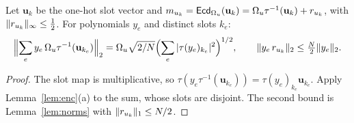 \begin{lemma}[Masking]\label{lem:mask}
Let $\mathbf u_k$ be the one-hot slot vector and $m_{u_k}=\mathsf{Ecd}_{\Omega_u}(\mathbf u_k)=\Omega_u\tau^{-1}(\mathbf u_k)+r_{u_k}$, with $\lVert r_{u_k}\rVert_\infty\le\frac12$. For polynomials $y_e$ and distinct slots $k_e$:
\[
  \Bigl\|\sum_e y_e\,\Omega_u\tau^{-1}(\mathbf u_{k_e})\Bigr\|_2=\Omega_u\sqrt{2/N}\Bigl(\sum_e|\tau(y_e)_{k_e}|^2\Bigr)^{1/2},
  \qquad
  \lVert y_e\,r_{u_k}\rVert_2\le\tfrac N2\lVert y_e\rVert_2 .
\]
\end{lemma}
\begin{proof}
The slot map is multiplicative, so $\tau(y_e\tau^{-1}(\mathbf u_{k_e}))=\tau(y_e)_{k_e}\mathbf u_{k_e}$. Apply Lemma~\ref{lem:enc}(a) to the sum, whose slots are disjoint. The second bound is Lemma~\ref{lem:norms} with $\lVert r_{u_k}\rVert_1\le N/2$.
\end{proof}
